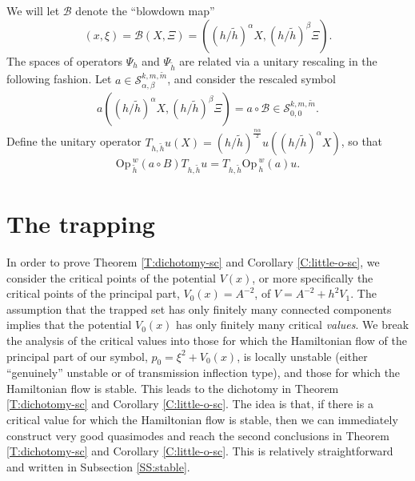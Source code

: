\documentclass[twoside, final]{amsart}
\theoremstyle{definition}
\numberwithin{equation}{section}
\begin{document}
We will let ${\mathcal{B}}$ denote the ``blowdown map'' 
\begin{equation}\label{blowdown}
(x,\xi)={\mathcal{B}}(X,\Xi)=((h/{\tilde{h}})^\alpha X, (h/{\tilde{h}})^\beta \Xi).
\end{equation}
The spaces of operators $\Psi_h$ and 
$\Psi_{\tilde{h}}$ are related via a unitary rescaling in the
following fashion.  
Let $a \in {{\mathcal S}}_{\alpha,\beta}^{k,m,\tilde{m}}$, and consider the
rescaled symbol
\begin{eqnarray*}
a\left({{\left( h/\tilde{h} \right)}}^{\alpha}X, {{\left( h/\tilde{h} \right)}}^{\beta} \Xi
\right)= a \circ {\mathcal{B}} \in {{\mathcal S}}_{0,0}^{k,m,\tilde{m}}.
\end{eqnarray*}
Define the unitary operator $T_{h, \tilde{h}} u(X) = {{\left( h/\tilde{h} \right)}}^{\frac{n\alpha}{2}}u\left(
  {{\left( h/\tilde{h} \right)}}^{\alpha} X \right)$,   
so that
\begin{eqnarray*}\label{rescaledquantization}
{\mathrm{Op}\,}_{\tilde{h}}^w(a\circ B) T_{h, \tilde{h}} u= T_{h, \tilde{h}} {\mathrm{Op}\,}_h^w(a) u.
\end{eqnarray*}

\section{The trapping}

In order to prove Theorem \ref{T:dichotomy-sc} and Corollary \ref{C:little-o-sc}, we consider the
critical points of the potential $V(x)$, or more specifically the
critical points of the principal part, $V_0(x) = A^{-2}$, of $V = A^{-2} + h^2 V_1$.  The assumption that the
trapped set has only finitely many connected components implies that
the potential $V_0(x)$ has only finitely many critical {\it values}.  We break
the analysis of the critical values into those for which the
Hamiltonian flow of the principal part of our symbol, $p_0 = \xi^2 + V_0(x)$, is locally unstable (either
``genuinely'' unstable or of transmission inflection type), and those
for which the Hamiltonian flow is stable.  This leads to the dichotomy
in Theorem \ref{T:dichotomy-sc} and Corollary \ref{C:little-o-sc}.
The idea is that, if there is a critical value for which the
Hamiltonian flow is stable, then we can immediately construct very
good quasimodes and reach the second conclusions in Theorem
\ref{T:dichotomy-sc} and Corollary \ref{C:little-o-sc}.  This is
relatively straightforward and written in Subsection \ref{SS:stable}.
\end{document}
